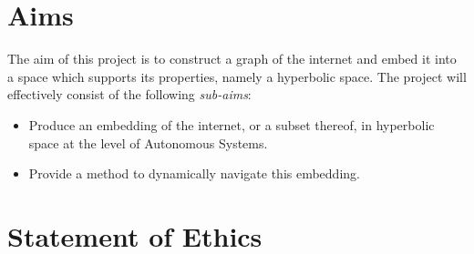 \section{Aims}

The aim of this project is to construct a graph of the internet and embed it into a space which supports its properties, namely a hyperbolic space. The project will effectively consist of the following \textit{sub-aims}:

\begin{itemize}
	\item{Produce an embedding of the internet, or a subset thereof, in hyperbolic space at the level of Autonomous Systems.}
	\item{Provide a method to dynamically navigate this embedding.}
\end{itemize}

\section{Statement of Ethics}

